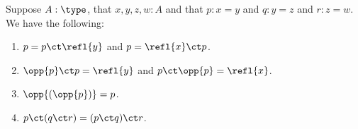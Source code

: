 %
\begin{lem}\label{thm:omg}%
  Suppose $A:\type$, that $x,y,z,w:A$ and that $p:x= y$ and $q:y = z$ and $r:z=w$.
  We have the following:
  \begin{enumerate}
  \item $p= p\ct \refl{y}$ and $p = \refl{x} \ct p$.\label{item:omg1}
  \item $\opp{p}\ct p=  \refl{y}$ and $p\ct \opp{p}= \refl{x}$.\label{item:omg2}
  \item $\opp{(\opp{p})}= p$.\label{item:omg3}
  \item $p\ct (q\ct r)=  (p\ct q)\ct r$.\label{item:omg4}
  \end{enumerate}
\end{lem}

